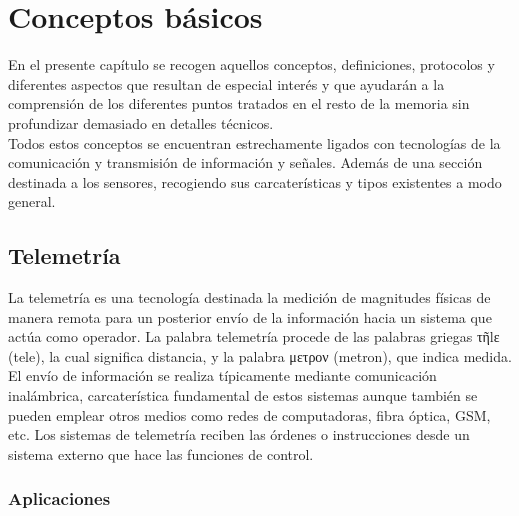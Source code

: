 
\newpage

\chapter{Conceptos básicos}
\label{chap:conceptos-básicos}


En el presente capítulo se recogen aquellos conceptos, definiciones, protocolos y diferentes aspectos que resultan de especial interés y que ayudarán a la comprensión de los diferentes puntos tratados en el resto de 
la memoria sin profundizar demasiado en detalles técnicos.\\

Todos estos conceptos se encuentran estrechamente ligados con tecnologías de la comunicación y transmisión de información y señales. Además de una sección destinada a los sensores, recogiendo sus 
carcaterísticas y tipos existentes a modo general.\\


\section{Telemetría}
\label{def:telemetria}

La telemetría es una tecnología destinada la medición de magnitudes físicas de manera remota para un posterior envío de la información hacia un sistema que actúa como operador. La palabra telemetría
procede de las palabras griegas τῆlε (tele), la cual significa distancia, y la palabra μετρον (metron), que indica medida.\\

El envío de información se realiza típicamente mediante comunicación inalámbrica, carcaterística fundamental de estos sistemas aunque también se pueden emplear otros medios 
como redes de computadoras, fibra óptica, GSM, etc. Los sistemas de telemetría reciben las órdenes o instrucciones desde un sistema externo que hace las 
funciones de control.\\

\subsection{Aplicaciones}

